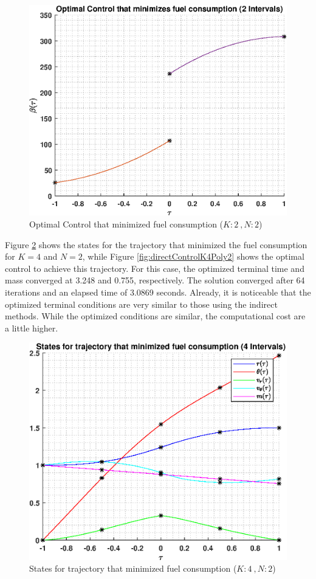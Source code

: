 \documentclass[]{article}
\begin{document}
\begin{figure}
	\centering
	\includegraphics[scale=0.75]{directControlK2Poly2.eps}
	\caption{Optimal Control that minimized fuel consumption (\(K:2\ , N:2\))}
	\label{fig:directControlK2Poly2}
\end{figure}
\vspace{2mm}\newline 
Figure \ref{fig:directStatesK4Poly2} shows the states for the trajectory that minimized the fuel consumption for \(K = 4\) and  \(N = 2\), while Figure \ref{fig:directControlK4Poly2} shows the optimal control to achieve this trajectory. For this case, the optimized terminal time and mass converged at 3.248 and  0.755, respectively. The solution converged after 64 iterations and an elapsed time of 3.0869 seconds. Already, it is noticeable that the optimized terminal conditions are very similar to those using the indirect methods. While the optimized conditions are similar, the computational cost are a little higher.
\begin{figure}
	\centering
	\includegraphics[scale=0.75]{directStatesK4Poly2.eps}
	\caption{States for trajectory that minimized fuel consumption (\(K:4\ , N:2\))}
	\label{fig:directStatesK4Poly2}
\end{figure}
\end{document}
